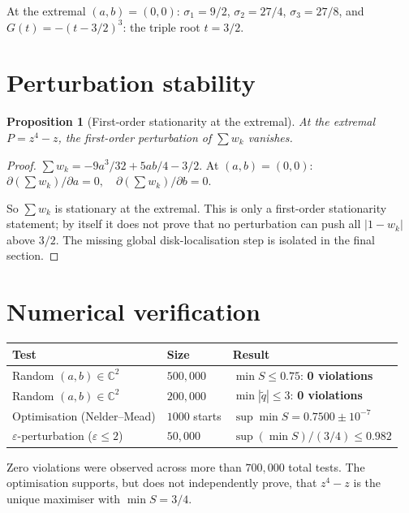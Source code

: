 \documentclass[11pt,a4paper]{article}
\newtheorem{proposition}[theorem]{Proposition}
\begin{document}
At the extremal $(a, b) = (0, 0)$: $\sigma_1 = 9/2$, $\sigma_2 = 27/4$, $\sigma_3 = 27/8$, and $G(t) = -(t - 3/2)^3$: the triple root $t = 3/2$.

\section{Perturbation stability}

\begin{proposition}[First-order stationarity at the extremal]
At the extremal $P = z^4 - z$, the first-order perturbation of $\sum w_k$ vanishes.
\end{proposition}

\begin{proof}
$\sum w_k = -9 a^3/32 + 5 ab/4 - 3/2$. At $(a, b) = (0, 0)$:
$\partial(\sum w_k)/\partial a = 0, \quad \partial(\sum w_k)/\partial b = 0.$

So $\sum w_k$ is stationary at the extremal. This is only a first-order
stationarity statement; by itself it does not prove that no perturbation can
push all $|1-w_k|$ above $3/2$. The missing global disk-localisation step is
isolated in the final section.
\end{proof}

\section{Numerical verification}

\begin{center}
\begin{tabular}{lll}
\toprule
\textbf{Test} & \textbf{Size} & \textbf{Result} \\
\midrule
Random $(a, b) \in \mathbb{C}^2$         & $500{,}000$ & $\min S \le 0.75$: \textbf{0 violations} \\
Random $(a, b) \in \mathbb{C}^2$         & $200{,}000$ & $\min |\tilde{q}| \le 3$: \textbf{0 violations} \\
Optimisation (Nelder--Mead)              & $1000$ starts & $\sup \min S = 0.7500 \pm 10^{-7}$ \\
$\varepsilon$-perturbation ($\varepsilon \le 2$) & $50{,}000$ & $\sup(\min S)/(3/4) \le 0.982$ \\
\bottomrule
\end{tabular}
\end{center}

Zero violations were observed across more than $700{,}000$ total tests. The optimisation supports, but does not independently prove, that $z^4 - z$ is the unique maximiser with $\min S = 3/4$.
\end{document}
